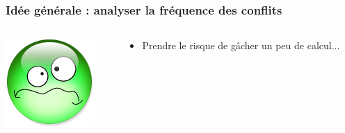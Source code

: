 \documentclass[xcolor={x11names,svgnames},x11names,svgnames]{beamer}
\begin{document}

\begin{frame}[label=idea1]
  \frametitle{Idée générale : \textbf{analyser la fréquence des conflits}}

  \begin{columns}[c]
    \begin{column}{.1\textwidth}
      \vspace{1mm}
      \includegraphics[width=\textwidth]{triste.png}
    \end{column}
    
    \begin{column}{.9\textwidth}
      \begin{itemize}
      \item Prendre le risque de gâcher un peu de calcul...
      \end{itemize}
    \end{column}
  \end{columns}

  \vspace{1cm}
  

\end{frame}
\end{document}
